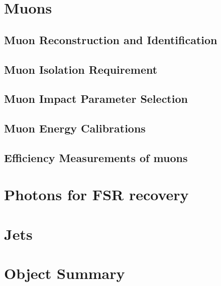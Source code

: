 \clearpage

\section{Muons}

\subsection{Muon Reconstruction and Identification}
\label{sec:muonReco}

\subsection{Muon Isolation Requirement}
\label{sec:muoniso}


\subsection{Muon Impact Parameter Selection}                                                                                                                                                                                                 
\label{sec:muSIP}  


\subsection{Muon Energy Calibrations}
 

\subsection{Efficiency Measurements of muons}
\label{sec:muonEffMeas}



%

\clearpage

\section{Photons for FSR recovery}
\label{sec:FSRphotons}


\section{Jets}
\label{sec:jets}


\clearpage
\section{Object Summary}
\label{sec:objsum}

